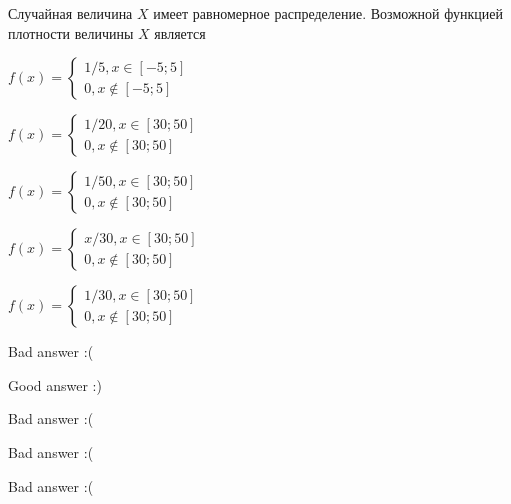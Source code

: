 
\begin{question}
Случайная величина \(X\) имеет равномерное распределение. Возможной
функцией плотности величины \(X\) является
\begin{answerlist}
  \item \(f(x) = \begin{cases} 1/5, x \in [-5;5] \\ 0, x\notin [-5;5] \end{cases}\)
  \item \(f(x) = \begin{cases} 1/20, x \in [30;50] \\ 0, x\notin [30;50] \end{cases}\)
  \item \(f(x) = \begin{cases} 1/50, x \in [30;50] \\ 0, x\notin [30;50] \end{cases}\)
  \item \(f(x) = \begin{cases} x/30, x \in [30;50] \\ 0, x\notin [30;50] \end{cases}\)
  \item \(f(x) = \begin{cases} 1/30, x \in [30;50] \\ 0, x\notin [30;50] \end{cases}\)
\end{answerlist}
\end{question}

\begin{solution}
\begin{answerlist}
  \item Bad answer :(
  \item Good answer :)
  \item Bad answer :(
  \item Bad answer :(
  \item Bad answer :(
\end{answerlist}
\end{solution}

